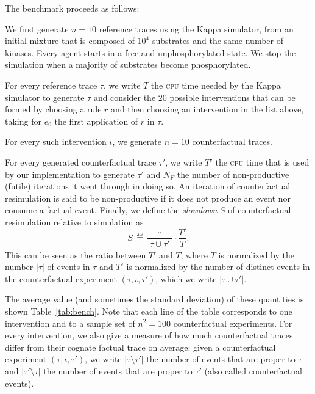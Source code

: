 The benchmark proceeds as follows:
\begin{inparaenum}[(i)]
\item We first generate $n=10$ reference traces using the Kappa
  simulator, from an initial mixture that is composed of $10^4$
  substrates and the same number of kinases. Every agent starts in a
  free and unphosphorylated state. We stop the simulation when a
  majority of substrates become phosphorylated.
\item For every reference trace $\tau$, we write $T$ the \textsc{cpu} time
  needed by the Kappa simulator to generate $\tau$ and consider the
  $20$ possible interventions that can be formed by choosing a rule
  $r$ and then choosing an intervention in the list above, taking for
  $e_0$ the first application of $r$ in $\tau$.
\item For every such intervention $\iota$, we generate $n = 10$ counterfactual
  traces.
\item For every generated counterfactual trace $\tau'$, we write $T'$
  the \textsc{cpu} time that is used by our implementation to generate
  $\tau'$ and $N_F$ the number of non-productive (futile) iterations
  it went through in doing so. An iteration of counterfactual
  resimulation is said to be non-productive if it does not produce an
  event nor consume a factual event. Finally, we define the \textit{slowdown}
  $S$ of counterfactual resimulation relative to simulation as
  \[ S \,\eqdef\, \frac{|\tau|}{|\tau \cup \tau'|} \cdot \frac{T'}{T}. \]
  This can be seen as the ratio between $T'$ and $T$, where $T$ is
  normalized by the number $|\tau|$ of events in $\tau$ and $T'$ is
  normalized by the number of distinct events in the counterfactual experiment
  $(\tau, \iota, \tau')$, which we write $|\tau \cup \tau'|$.

  The average value (and sometimes the standard deviation) of these
  quantities is shown Table~\ref{tab:bench}. Note that each line of
  the table corresponds to one intervention and to a sample set of
  $n^2 = 100$ counterfactual experiments. For every intervention, we
  also give a measure of how much counterfactual traces differ from
  their cognate factual trace on average: given a counterfactual
  experiment $(\tau, \iota, \tau')$, we write
  $|\tau \!\setminus\! \tau'|$ the number of events that are proper to
  $\tau$ and $|\tau' \!\setminus\! \tau|$ the number of events that
  are proper to $\tau'$ (also called counterfactual events).
\end{inparaenum}

